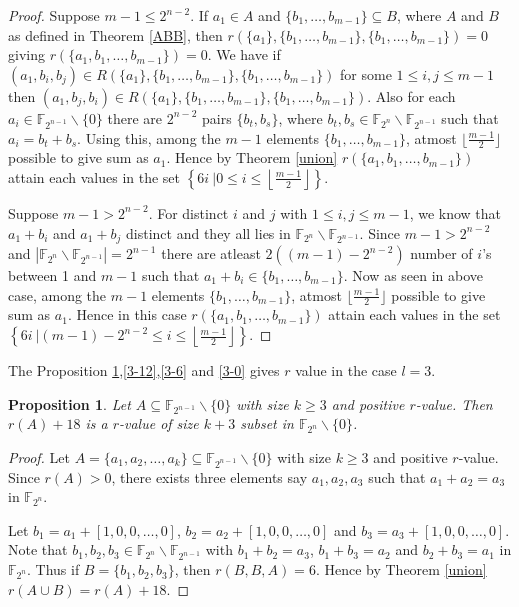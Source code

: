 \documentclass[12pt,a4paper]{article}
\newtheorem{prop}{Proposition}[section]
\begin{document}
	\begin{proof}
		Suppose $m-1\leq2^{n-2}$. If $a_1\in A$ and $\{b_1,\dots,b_{m-1}\}\subseteq B$, where $A$ and $B$ as defined in Theorem \ref{ABB}, then $r(\{a_1\},\{b_1,\dots,b_{m-1}\},\{b_1,\dots,b_{m-1}\})=0$ giving $r(\{a_1,b_1,\dots,b_{m-1}\})=0$. We have if $(a_1,b_i,b_j)\in R(\{a_1\},\{b_1,\dots,b_{m-1}\},\{b_1,\dots,b_{m-1}\})$ for some $1\leq i,j\leq m-1$ then $(a_1,b_j,b_i)\in R(\{a_1\},\{b_1,\dots,b_{m-1}\},\{b_1,\dots,b_{m-1}\})$. Also for each $a_i\in\mathbb{F}_{2^{n-1}}\backslash\{0\}$ there are $2^{n-2}$ pairs $\{b_t,b_s\}$, where $b_t,b_s\in\mathbb{F}_{2^n}\backslash\mathbb{F}_{2^{n-1}}$ such that $a_i=b_t+b_s$. Using this, among the $m-1$  elements $\{b_1,\dots,b_{m-1}\}$, atmost $\lfloor\frac{m-1}{2}\rfloor$ possible to give sum as $a_1$. Hence by Theorem \ref{union} $r(\{a_1,b_1,\dots,b_{m-1}\})$ attain each values in the set $\left\{6i~|0\leq i\leq \left\lfloor\frac{m-1}{2}\right\rfloor\right\}$. 
		
		Suppose $m-1>2^{n-2}$. For distinct $i$ and $j$ with $1\leq i,j\leq m-1$, we know that $a_1+b_i$ and $a_1+b_j$ distinct and they all lies in $\mathbb{F}_{2^n}\backslash\mathbb{F}_{2^{n-1}}$. Since  $m-1>2^{n-2}$ and $|\mathbb{F}_{2^n}\backslash\mathbb{F}_{2^{n-1}}|=2^{n-1}$ there are atleast $2((m-1)-2^{n-2})$ number of $i$'s between 1 and $m-1$ such that $a_1+b_i\in\{b_1,\dots,b_{m-1}\}$. Now as seen in above case, among the $m-1$  elements $\{b_1,\dots,b_{m-1}\}$, atmost $\lfloor\frac{m-1}{2}\rfloor$ possible to give sum as $a_1$. Hence in this case $r(\{a_1,b_1,\dots,b_{m-1}\})$ attain each values in the set $\left\{6i~|(m-1)-2^{n-2}\leq i\leq \left\lfloor\frac{m-1}{2}\right\rfloor\right\}$.
		
	\end{proof}
	The Proposition \ref{3-18},\ref{3-12},\ref{3-6} and \ref{3-0} gives $r$ value in the case $l=3$.
	\begin{prop}\label{3-18}
		Let $A\subseteq\mathbb{F}_{2^{n-1}}\backslash\{0\}$ with size $k\geq3$ and positive $r$-value. Then $r(A)+18$ is a $r$-value of size $k+3$ subset in $\mathbb{F}_{2^{n}}\backslash\{0\}$.
	\end{prop}
	\begin{proof}
		Let $A=\{a_1,a_2,\dots,a_k\}\subseteq\mathbb{F}_{2^{n-1}}\backslash\{0\}$ with size $k\geq3$ and positive $r$-value. Since $r(A)>0$, there exists three elements say $a_1,a_2,a_3$ such that $a_1+a_2=a_3$ in $\mathbb{F}_{2^n}$. 
		
		Let $b_1=a_1+[1,0,0,\dots,0]$, $b_2=a_2+[1,0,0,\dots,0]$ and $b_3=a_3+[1,0,0,\dots,0]$. Note that $b_1,b_2,b_3\in\mathbb{F}_{2^n}\backslash\mathbb{F}_{2^{n-1}}$ with $b_1+b_2=a_3$, $b_1+b_3=a_2$ and $b_2+b_3=a_1$ in $\mathbb{F}_{2^n}$. Thus if $B=\{b_1,b_2,b_3\}$, then $r(B,B,A)=6$. Hence by Theorem \ref{union} $r(A\cup B)=r(A)+18$.
	\end{proof}
	
\end{document}
